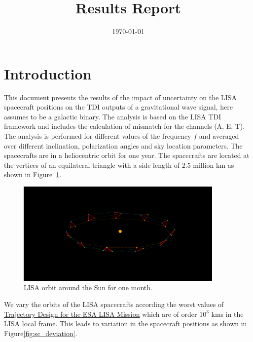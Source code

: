 \documentclass[a4paper,12pt]{article}
\title{Results Report}
\author{}
\date{\today}
\begin{document}
\maketitle


\section{Introduction}
This document presents the results of the impact of uncertainty on the LISA spacecraft positions on the TDI outputs of a gravitational wave signal, here assumes to be a galactic binary. The analysis is based on the LISA TDI framework and includes the calculation of mismatch for the channels (A, E, T). 
The analysis is performed for different values of the frequency $f$ and averaged over different inclination, polarization angles and sky location parameters. The spacecrafts are in a heliocentric orbit for one year. The spacecrafts are located at the vertices of an equilateral triangle with a side length of 2.5 million km as shown in Figure~\ref{fig:lisa_orbit}. 
 
\begin{figure}
    \centering
    \includegraphics[width=0.9\textwidth]{figures/3d_orbit_around_sun.png}
    \caption{LISA orbit around the Sun for one month.}
    \label{fig:lisa_orbit}
\end{figure}

We vary the orbits of the LISA spacecrafts according the worst values of \href{https://doi.org/10.1007/s40295-021-00263-2}{Trajectory Design for the ESA LISA Mission} which are of order $10^3$ kms in the LISA local frame. This leads to variation in the spacecraft positions as shown in Figure\ref{fig:sc_deviation}.
\end{document}
